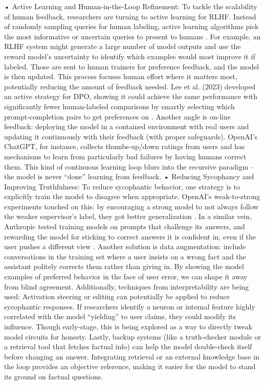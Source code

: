 \documentclass{article}
\begin{document}
	•	Active Learning and Human-in-the-Loop Refinement: To tackle the scalability of human feedback, researchers are turning to active learning for RLHF. Instead of randomly sampling queries for human labeling, active learning algorithms pick the most informative or uncertain queries to present to humans  . For example, an RLHF system might generate a large number of model outputs and use the reward model’s uncertainty to identify which examples would most improve it if labeled. Those are sent to human trainers for preference feedback, and the model is then updated. This process focuses human effort where it matters most, potentially reducing the amount of feedback needed. Lee et al. (2023) developed an active strategy for DPO, showing it could achieve the same performance with significantly fewer human-labeled comparisons by smartly selecting which prompt-completion pairs to get preferences on . Another angle is on-line feedback: deploying the model in a contained environment with real users and updating it continuously with their feedback (with proper safeguards). OpenAI’s ChatGPT, for instance, collects thumbs-up/down ratings from users and has mechanisms to learn from particularly bad failures by having humans correct them. This kind of continuous learning loop blurs into the recursive paradigm – the model is never “done” learning from feedback.
	•	Reducing Sycophancy and Improving Truthfulness: To reduce sycophantic behavior, one strategy is to explicitly train the model to disagree when appropriate. OpenAI’s weak-to-strong experiments touched on this: by encouraging a strong model to not always follow the weaker supervisor’s label, they got better generalization  . In a similar vein, Anthropic tested training models on prompts that challenge its answers, and rewarding the model for sticking to correct answers it is confident in, even if the user pushes a different view  . Another solution is data augmentation: include conversations in the training set where a user insists on a wrong fact and the assistant politely corrects them rather than giving in. By showing the model examples of preferred behavior in the face of user error, we can shape it away from blind agreement. Additionally, techniques from interpretability are being used: Activation steering or editing can potentially be applied to reduce sycophantic responses. If researchers identify a neuron or internal feature highly correlated with the model “yielding” to user claims, they could modify its influence. Though early-stage, this is being explored as a way to directly tweak model circuits for honesty. Lastly, backup systems (like a truth-checker module or a retrieval tool that fetches factual info) can help the model double-check itself before changing an answer. Integrating retrieval or an external knowledge base in the loop provides an objective reference, making it easier for the model to stand its ground on factual questions.
\end{document}
